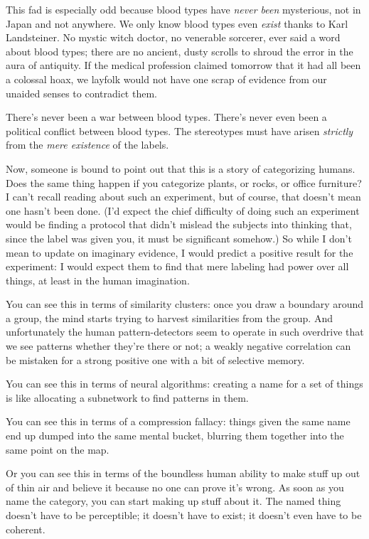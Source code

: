 {
 This fad is especially odd because blood types have \textit{never
been} mysterious, not in Japan and not anywhere. We only know blood
types even \textit{exist} thanks to Karl Landsteiner. No mystic witch
doctor, no venerable sorcerer, ever said a word about blood types;
there are no ancient, dusty scrolls to shroud the error in the aura of
antiquity. If the medical profession claimed tomorrow that it had all
been a colossal hoax, we layfolk would not have one scrap of evidence
from our unaided senses to contradict them.}

{
 There's never been a war between blood types.
There's never even been a political conflict between
blood types. The stereotypes must have arisen \textit{strictly} from
the \textit{mere existence} of the labels.}

{
 Now, someone is bound to point out that this is a story of
categorizing humans. Does the same thing happen if you categorize
plants, or rocks, or office furniture? I can't recall
reading about such an experiment, but of course, that
doesn't mean one hasn't been done.
(I'd expect the chief difficulty of doing such an
experiment would be finding a protocol that didn't
mislead the subjects into thinking that, since the label was given you,
it must be significant somehow.) So while I don't mean
to update on imaginary evidence, I would predict a positive result for
the experiment: I would expect them to find that mere labeling had
power over all things, at least in the human imagination.}

{
 You can see this in terms of similarity clusters: once you draw a
boundary around a group, the mind starts trying to harvest similarities
from the group. And unfortunately the human pattern-detectors seem to
operate in such overdrive that we see patterns whether
they're there or not; a weakly negative correlation can
be mistaken for a strong positive one with a bit of selective memory.}

{
 You can see this in terms of neural algorithms: creating a name
for a set of things is like allocating a subnetwork to find patterns in
them.}

{
 You can see this in terms of a compression fallacy: things given
the same name end up dumped into the same mental bucket, blurring them
together into the same point on the map.}

{
 Or you can see this in terms of the boundless human ability to
make stuff up out of thin air and believe it because no one can prove
it's wrong. As soon as you name the category, you can
start making up stuff about it. The named thing doesn't
have to be perceptible; it doesn't have to exist; it
doesn't even have to be coherent.}

